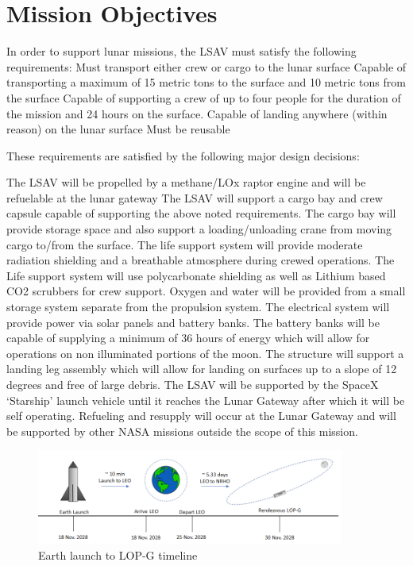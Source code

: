 \documentclass[10pt]{article}
\begin{document}
\section{Mission Objectives}

In order to support lunar missions, the LSAV must satisfy the
following requirements: Must transport either crew or cargo to the
lunar surface Capable of transporting a maximum of 15 metric tons to
the surface and 10 metric tons from the surface Capable of supporting
a crew of up to four people for the duration of the mission and 24
hours on the surface.  Capable of landing anywhere (within reason) on
the lunar surface Must be reusable

These requirements are satisfied by the following major design decisions:

The LSAV will be propelled by a methane/LOx raptor engine and will be
refuelable at the lunar gateway The LSAV will support a cargo bay and
crew capsule capable of supporting the above noted requirements. The
cargo bay will provide storage space and also support a
loading/unloading crane from moving cargo to/from the surface.  The
life support system will provide moderate radiation shielding and a
breathable atmosphere during crewed operations. The Life support
system will use polycarbonate shielding as well as Lithium based CO2
scrubbers for crew support. Oxygen and water will be provided from a
small storage system separate from the propulsion system.  The
electrical system will provide power via solar panels and battery
banks. The battery banks will be capable of supplying a minimum of 36
hours of energy which will allow for operations on non illuminated
portions of the moon.  The structure will support a landing leg
assembly which will allow for landing on surfaces up to a slope of 12
degrees and free of large debris.  The LSAV will be supported by the
SpaceX ‘Starship’ launch vehicle until it reaches the Lunar Gateway
after which it will be self operating.  Refueling and resupply will
occur at the Lunar Gateway and will be supported by other NASA
missions outside the scope of this mission.

\begin{figure}[H]
  \centering
  \includegraphics[width=0.9\textwidth]{toon1}
  \caption{Earth launch to LOP-G timeline}
  \label{fig:toon1}
\end{figure}
\end{document}
